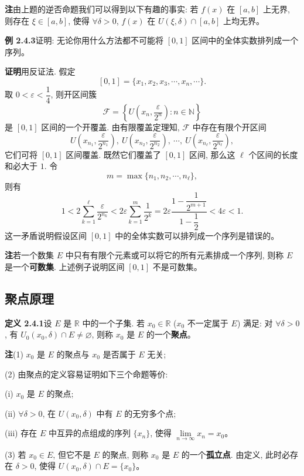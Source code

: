 \documentclass[UTF8,12pt,a4paper,fontset=fandol]{ctexart}
\begin{document}
\noindent\textbf{注}\quad 由上题的逆否命题我们可以得到以下有趣的事实: 若 $f(x)$ 在 $[a,b]$ 上无界, 则存在 $\xi\in[a,b]$, 使得 $\forall\delta>0$, $f(x)$ 在 $U(\xi,\delta)\cap[a,b]$ 上均无界。

\noindent\textbf{例 2.4.3}\quad 证明: 无论你用什么方法都不可能将 $[0,1]$ 区间中的全体实数排列成一个序列。

\noindent\textbf{证明}\quad 用反证法. 假定
\[
  [0,1]=\{x_1,x_2,x_3,\cdots,x_n,\cdots\}.
\]
取 $0<\varepsilon<\dfrac14$, 则开区间簇
\[
  \mathcal{F}=\left\{U\left(x_n,\frac{\varepsilon}{2^n}\right):n\in\mathbb{N}\right\}
\]
是 $[0,1]$ 区间的一个开覆盖. 由有限覆盖定理知, $\mathcal{F}$ 中存在有限个开区间
\[
  U\left(x_{n_1},\frac{\varepsilon}{2^{n_1}}\right),\
  U\left(x_{n_2},\frac{\varepsilon}{2^{n_2}}\right),\
  \cdots,\
  U\left(x_{n_\ell},\frac{\varepsilon}{2^{n_\ell}}\right),
\]
它们可将 $[0,1]$ 区间覆盖. 既然它们覆盖了 $[0,1]$ 区间, 那么这 $\ell$ 个区间的长度和必大于 $1$. 令
\[
  m=\max\{n_1,n_2,\cdots,n_\ell\},
\]
则有
\[
  1<
  2\sum_{k=1}^{\ell}\frac{\varepsilon}{2^{n_k}}
  <
  2\varepsilon\sum_{k=1}^m\frac1{2^k}
  =
  2\varepsilon\frac{1-\dfrac1{2^{m+1}}}{1-\dfrac12}
  <
  4\varepsilon<1.
\]
这一矛盾说明假设区间 $[0,1]$ 中的全体实数可以排列成一个序列是错误的。

\noindent\textbf{注}\quad 若一个数集 $E$ 中只有有限个元素或可以将它的所有元素排成一个序列, 则称 $E$ 是一个\textbf{可数集}. 上述例子说明区间 $[0,1]$ 不是可数集。

\subsection{聚点原理}

\noindent\textbf{定义 2.4.1}\quad 设 $E$ 是 $\mathbb{R}$ 中的一个子集. 若 $x_0\in\mathbb{R}$ ($x_0$ 不一定属于 $E$) 满足: 对 $\forall\delta>0$, 有 $U_0(x_0,\delta)\cap E\ne\varnothing$, 则称 $x_0$ 是 $E$ 的一个\textbf{聚点}。

\noindent\textbf{注}\quad (1) $x_0$ 是 $E$ 的聚点与 $x_0$ 是否属于 $E$ 无关;

(2) 由聚点的定义容易证明如下三个命题等价:

(i) $x_0$ 是 $E$ 的聚点;

(ii) $\forall\delta>0$, 在 $U(x_0,\delta)$ 中有 $E$ 的无穷多个点;

(iii) 存在 $E$ 中互异的点组成的序列 $\{x_n\}$, 使得 $\lim\limits_{n\to\infty}x_n=x_0$。

(3) 若 $x_0\in E$, 但它不是 $E$ 的聚点, 则称 $x_0$ 是 $E$ 的一个\textbf{孤立点}. 由定义, 此时必存在 $\delta>0$, 使得 $U(x_0,\delta)\cap E=\{x_0\}$。
\end{document}
